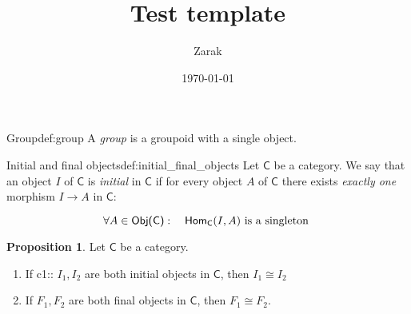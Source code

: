\documentclass[a4paper]{article}
\title{Test template}
\author{Zarak}
\date{\today}
\newcommand{\cat}{%
  \textsf%
}
\theoremstyle{definition}
\newtheorem{proposition}{Proposition}
\begin{document}
\maketitle

\begin{definition}{Group}{def:group}
  A \textit{group} is a groupoid with a single object.
\end{definition}

\begin{definition}{Initial and final objects}{def:initial_final_objects}
  Let $\cat{C}$ be a category. We say that an object $I$ of $\cat{C}$ is
  \textit{initial} in $\cat{C}$ if for every object $A$ of $\cat{C}$ there exists
  \textit{exactly one} morphism $I \to  A$ in $\cat{C}$:

  \begin{equation*}
    \forall A \in \cat{Obj(C)} : \quad \cat{Hom}_\cat{C}(I, A) \text{ is
    a singleton }
  \end{equation*}
\end{definition}

\begin{proposition}
  Let $\cat{C}$ be a category.
  \begin{enumerate}
  \item If {{c1:: $ I_1, I_2$ }} are both initial objects in $\cat{C}$, then $ I_1
      \cong I_2$
    \item If $F_1, F_2$ are both final objects in $ \cat{C}$, then $ F_1 \cong
      F_2$.
  \end{enumerate}
\end{proposition}
\end{document}
